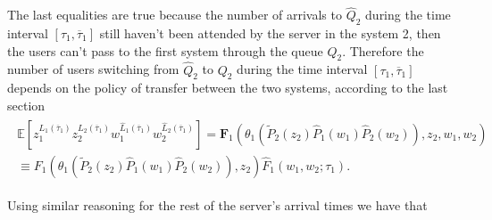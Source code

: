 \documentclass{article}
\newcommand{\esp}{\mathbb{E}}
\begin{document}
The last equalities  are true because the number of arrivals to $\hat{Q}_{2}$ 
during the time interval $\left[\tau_{1},\overline{\tau}_{1}\right]$ still haven't been attended by the server in the system 2, then the users can't pass to the first system through the queue $Q_{2}$. Therefore the number of users switching from $\hat{Q}_{2}$ to $Q_{2}$ during the time interval $\left[\tau_{1},\overline{\tau}_{1}\right]$ depends on the policy of transfer between the two systems, according to the last section
\begin{eqnarray*}\label{Eq.Fs}
\begin{array}{l}
\esp\left[z_{1}^{L_{1}\left(\overline{\tau}_{1}\right)}z_{2}^{L_{2}\left(\overline{\tau}_{1}
\right)}w_{1}^{\hat{L}_{1}\left(\overline{\tau}_{1}\right)}w_{2}^{\hat{L}_{2}\left(
\overline{\tau}_{1}\right)}\right]
=\mathbf{F}_{1}\left(\theta_{1}\left(\tilde{P}_{2}\left(z_{2}\right)
\hat{P}_{1}\left(w_{1}\right)\hat{P}_{2}\left(w_{2}\right)\right),z_{2},w_{1},w_{2}\right)\\
\equiv F_{1}\left(\theta_{1}\left(\tilde{P}_{2}\left(z_{2}\right)\hat{P}_{1}\left(w_{1}\right)\hat{P}_{2}\left(w_{2}\right)\right),z_{2}\right)\hat{F}_{1}\left(w_{1},w_{2};\tau_{1}\right).
\end{array}
\end{eqnarray*}%

Using similar reasoning for the rest of the server's arrival times we have that
\end{document}
